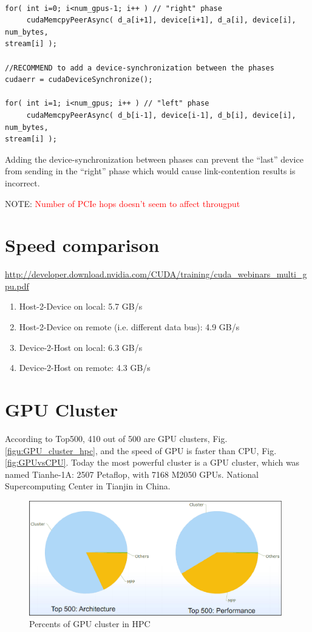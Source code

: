 \begin{lstlisting}

for( int i=0; i<num_gpus-1; i++ ) // "right" phase
     cudaMemcpyPeerAsync( d_a[i+1], device[i+1], d_a[i], device[i], num_bytes,
stream[i] ); 

//RECOMMEND to add a device-synchronization between the phases
cudaerr = cudaDeviceSynchronize();
 
for( int i=1; i<num_gpus; i++ ) // "left" phase
     cudaMemcpyPeerAsync( d_b[i-1], device[i-1], d_b[i], device[i], num_bytes,
stream[i] );
\end{lstlisting}
Adding the device-synchronization between phases can prevent the ``last'' device
from sending in the ``right'' phase which would cause link-contention results
is incorrect. 

NOTE: \textcolor{red}{Number of PCIe hops doesn't seem to affect througput}

\section{Speed comparison}
\label{sec:copy_speed}

\url{http://developer.download.nvidia.com/CUDA/training/cuda_webinars_multi_gpu.pdf}
\begin{enumerate}
  \item Host-2-Device on local:  5.7 GB/s
  \item Host-2-Device on remote (i.e. different data bus): 4.9 GB/s
  \item Device-2-Host on local: 6.3 GB/s
  \item Device-2-Host on remote: 4.3 GB/s 
\end{enumerate}

\section{GPU Cluster}
\label{sec:GPU_cluster}

According to Top500, 410 out of 500 are GPU clusters,
Fig.\ref{figu:GPU_cluster_hpc}, and the speed of GPU is faster than CPU,
Fig.\ref{fig:GPUvsCPU}.
Today the most powerful cluster is a GPU cluster, which was named Tianhe-1A: 2507 Petaflop, with 7168 M2050 GPUs.
National Supercomputing Center in Tianjin in China.

\begin{figure}[hbt]
  \centerline{\includegraphics[height=5cm,
    angle=0]{./images/GPU_cluster_hpc.eps}}
\caption{Percents of GPU cluster in HPC}
\label{fig:GPU_cluster-hpc}
\end{figure}

